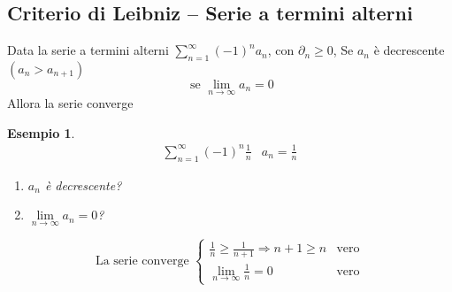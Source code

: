 \documentclass{book}
\newtheorem{esempio}{Esempio}
\begin{document}
\subsection{Criterio di Leibniz -- Serie a termini alterni\label{leibniz}}
Data la serie a termini alterni $\displaystyle\sum_{n=1}^\infty(-1)^na_n$, con 
$\partial_n\geq 0$, Se $a_n$ è decrescente $(a_n> a_{n+1})$
\begin{equation*}
	\text{ se }\lim_{n\to\infty} a_n=0
\end{equation*}
Allora la serie converge
\begin{esempio}
  \begin{eqnarray*}
    \displaystyle\sum_{n=1}^\infty (-1)^n\frac{1}{n} & a_n=\frac{1}{n}
  \end{eqnarray*}
  \begin{enumerate}
  \item $a_n$ è decrescente?
  \item $\lim\limits_{n\to\infty} a_n=0$?
  \end{enumerate}
  \begin{equation*}
    \text{La serie converge } \begin{cases}
                                \frac{1}{n}\geq \frac{1}{n+1} \Rightarrow n+1\geq n
                                & \text{vero}\\
                                \lim\limits_{n\to\infty} \frac{1}{n}=0 & \text{vero}
                              \end{cases}
  \end{equation*}                          
\end{esempio}
\clearpage
\end{document}
